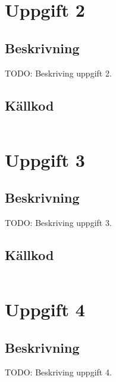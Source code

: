 \documentclass[11pt,a4paper]{article}
\begin{document}
\section{Uppgift 2}\label{uppgift-2}

\subsection{Beskrivning}
TODO: Beskriving uppgift 2.

\subsection{Källkod}\label{uppgift-2_src}
\inputminted[]{java}{../src/Lab1Uppg02.java}

\section{Uppgift 3}\label{uppgift-3}

\subsection{Beskrivning}
TODO: Beskriving uppgift 3.

\subsection{Källkod}\label{uppgift-3_src}
\inputminted[]{java}{../src/Lab1Uppg03.java}


\section{Uppgift 4}\label{uppgift-4}

\subsection{Beskrivning}
TODO: Beskriving uppgift 4.
\end{document}
